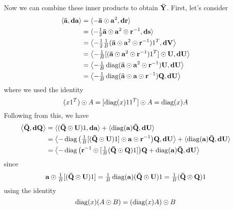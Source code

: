 Now we can combine these inner products to obtain $\gradobj{Y}$.
First, let's consider
\begin{align}
\langle \gradobj{a}, \obj{da} \rangle
& = \langle -\gradobj{a} \odot \obj{a}^{2}, \obj{dr} \rangle \\
& = \langle -\tfrac{1}{2} \gradobj{a} \odot \obj{a}^{2} \odot \obj{r}^{-1}, \obj{ds} \rangle \\
& = \left\langle -\tfrac{1}{2} \tfrac{1}{B} (\gradobj{a} \odot \obj{a}^{2} \odot \obj{r}^{-1}) 1^{T}, \obj{dV} \right\rangle \\
& = \left\langle -\tfrac{1}{B} [(\gradobj{a} \odot \obj{a}^{2} \odot \obj{r}^{-1}) 1^{T}] \odot \obj{U}, \obj{dU} \right\rangle \\
& = \left\langle -\tfrac{1}{B} \diag(\gradobj{a} \odot \obj{a}^{2} \odot \obj{r}^{-1}) \obj{U}, \obj{dU} \right\rangle \\
& = \left\langle -\tfrac{1}{B} \diag(\gradobj{a} \odot \obj{a} \odot \obj{r}^{-1}) \obj{Q}, \obj{dU} \right\rangle
\end{align}
where we used the identity
\begin{equation}
(x 1^{T}) \odot A = [\diag(x) 1 1^{T}] \odot A = \diag(x) A
\end{equation}
Following from this, we have
\begin{align}
\left\langle \gradobj{Q}, \obj{dQ} \right\rangle
& = \langle (\gradobj{Q} \odot \obj{U}) 1, \obj{da} \rangle + \langle \diag(\obj{a}) \gradobj{Q}, \obj{dU} \rangle \\
& = \left\langle -\diag\big( \tfrac{1}{B} [(\gradobj{Q} \odot \obj{U}) 1] \odot \obj{a} \odot \obj{r}^{-1} \big) \obj{Q}, \obj{dU} \right\rangle
  + \langle \diag(\obj{a}) \gradobj{Q}, \obj{dU} \rangle \\
& = \left\langle -\diag\big( \obj{r}^{-1} \odot [\tfrac{1}{B} (\gradobj{Q} \odot \obj{Q}) 1] \big) \obj{Q} + \diag(\obj{a}) \gradobj{Q}, \obj{dU} \right\rangle
\end{align}
since
\begin{equation}
\obj{a} \odot \tfrac{1}{B} [(\gradobj{Q} \odot \obj{U}) 1]
= \tfrac{1}{B} \diag(\obj{a}) (\gradobj{Q} \odot \obj{U}) 1
= \tfrac{1}{B} (\gradobj{Q} \odot \obj{Q}) 1
\end{equation}
using the identity
\begin{equation}
\diag(x) (A \odot B) = (\diag(x) A) \odot B
\end{equation}
